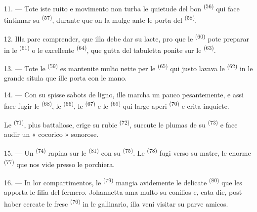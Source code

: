 11. --- Tote iste ruito e movimento non turba le quietude del bon  \textsuperscript{(56)} qui face tintinnar su 
\textsuperscript{(57)}, durante que on la mulge ante le porta del
 \textsuperscript{(58)}.

12. Illa pare comprender, que illa debe dar su lacte, pro que le
 \textsuperscript{(60)} pote preparar  in le
 \textsuperscript{(61)} o le excellente 
\textsuperscript{(64)}, que gutta del tabuletta ponite sur le 
\textsuperscript{(63)}.

13. --- Tote le  \textsuperscript{(59)} es mantenite multo
nette per le  \textsuperscript{(65)} qui justo lavava
le  \textsuperscript{(62)} in le grande situla que ille
porta con le mano.

\VUsaut{3.0mm}
\VUsaut{3.0mm}

14. --- Con su spisse sabots de ligno, ille marcha un pauco pesantemente, e assi
face fugir le  \textsuperscript{(68)}, le  \textsuperscript{(66)}, le  \textsuperscript{(67)}
e le  \textsuperscript{(69)} qui large aperi 
\textsuperscript{(70)} e crita inquiete.

Le  \textsuperscript{(71)}, plus battaliose, erige su rubie
 \textsuperscript{(72)}, succute le plumas de su 
\textsuperscript{(73)} e face audir un « cocorico » sonorose.

15. --- Un  \textsuperscript{(74)} rapina sur le
 \textsuperscript{(81)} con su 
\textsuperscript{(75)}. Le  \textsuperscript{(78)} fugi verso
su matre, le enorme  \textsuperscript{(77)} que nos vide presso le
porchiera.

16. --- In lor compartimentos, le  \textsuperscript{(79)}
mangia avidemente le delicate  \textsuperscript{(80)} que les
apporta le filia del fermero. Johannetta ama multo su conilios e, cata die, post
haber cercate le fresc  \textsuperscript{(76)} in le gallinario,
illa veni visitar su parve amicos.
\VUsaut{6.0mm}
\VUfilet{22mm}
